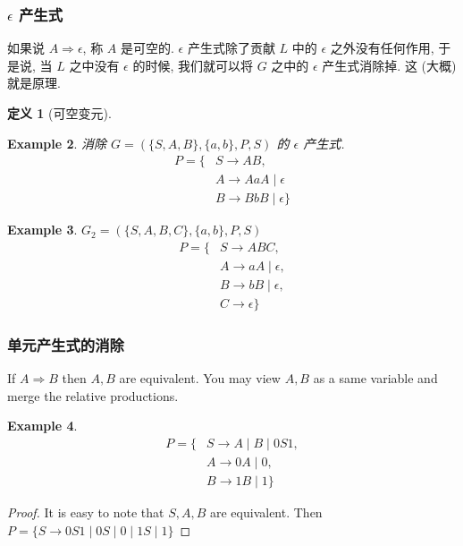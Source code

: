 \documentclass[12pt]{ctexart}
\theoremstyle{definition}
\theoremstyle{definition}
\newtheorem{definition}{定义}[section]
\theoremstyle{plain}
\newtheorem{exam}[definition]{Example}
\theoremstyle{remark}
\begin{document}
\subsubsection{\(\epsilon\) 产生式}
如果说 \(A \Rightarrow \epsilon\), 称 \(A\) 是可空的. \( \epsilon\) 产生式除了贡献 \(L\) 中的 \( \epsilon\) 之外没有任何作用, 于是说, 当 \(L \) 之中没有 \( \epsilon\) 的时候, 我们就可以将 \(G\) 之中的 \( \epsilon\) 产生式消除掉. 这 (大概) 就是原理. 
\begin{definition}[可空变元]\label{def:可空变元}
\end{definition}

\begin{exam}
	消除 \(G = ( \{ S ,A , B \} , \{ a, b \} , P , S )\) 的 \( \epsilon\) 产生式. 
	\begin{equation}
	\begin{aligned}
		P = \{ & S \to A B  , \\ 
		       & A \to A a A \mid \epsilon \\
		       & B \to B b B \mid \epsilon \}
	\end{aligned}
	\end{equation}
\end{exam}

\begin{exam}
	\(G_{2} = ( \{ S , A  , B , C \} , \{ a, b \} , P , S )\) 
	\begin{equation}
	\begin{aligned}
		P = \{ & S \to A B C , \\ 
		       & A \to a A \mid \epsilon , \\ 
		       & B \to b B \mid \epsilon , \\
		       & C \to \epsilon \}
	\end{aligned}
	\end{equation}
\end{exam}


\subsubsection{单元产生式的消除}
If \(A \Rightarrow B\) then \(A, B\) are equivalent. You may view \(A, B\) as a same variable and merge the relative productions.

\begin{exam}
	\begin{equation}
	\begin{aligned}
		P = \{ & S \to A \mid B \mid 0S 1 , \\ 
		       & A \to 0 A \mid 0 ,  \\ 
		       & B \to 1 B \mid 1 \}
	\end{aligned}
	\end{equation}
\end{exam}
\begin{proof}
It is easy to note that \(S, A , B \) are equivalent. Then 
\(P = \{ S \to 0S1 \mid 0 S \mid 0 \mid 1 S \mid 1\}\)
\end{proof}
\end{document}
